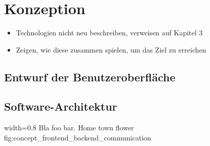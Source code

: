 \chapter{Konzeption}\label{konzeption}

\blindtext[1]

\begin{itemize}
\tightlist
\item
  Technologien nicht neu beschreiben, verweisen auf Kapitel 3
\item
  Zeigen, wie diese zusammen spielen, um das Ziel zu erreichen
\end{itemize}

\section{Entwurf der
Benutzeroberfläche}\label{entwurf-der-benutzeroberfluxe4che}

\section{Software-Architektur}\label{software-architektur}

   {width=0.8\textwidth}
   {Bla foo bar.}
   {Home town flower}
   {fig:concept_frontend_backend_communication}
